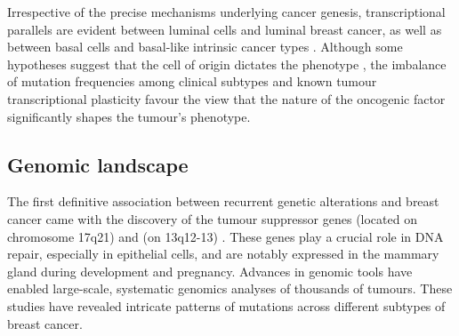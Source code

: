 Irrespective of the precise mechanisms underlying cancer genesis, transcriptional parallels are evident between luminal cells and luminal breast cancer, as well as between basal cells and basal-like intrinsic cancer types \parencite{Bhat-Nakshatri2021-jy}. Although some hypotheses suggest that the cell of origin dictates the phenotype \parencite{Skibinski2015-rh, Taurin2020-mq}, the imbalance of mutation frequencies among clinical subtypes \parencite{Cancer_Genome_Atlas_Network2012-gx,Russnes2017-eo} and known tumour transcriptional plasticity \parencite{Fan2020-vi, Su2015-ve,Yamamoto2014-th,Hein2016-lv} favour the view that the nature of the oncogenic factor significantly shapes the tumour's phenotype.

\subsection{Genomic landscape} 

The first definitive association between recurrent genetic alterations and breast cancer came with the discovery of the tumour suppressor genes  (located on chromosome 17q21) and  (on 13q12-13) \parencite{Wooster1994-xa, Hall1990-mg}. These genes play a crucial role in DNA repair, especially in epithelial cells, and are notably expressed in the mammary gland during development and pregnancy. Advances in genomic tools have enabled large-scale, systematic genomics analyses of thousands of tumours. These studies have revealed intricate patterns of mutations across different subtypes of breast cancer.



